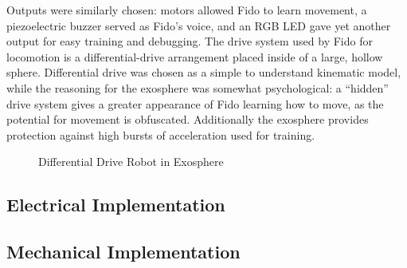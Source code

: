 Outputs were similarly chosen: motors allowed Fido to learn movement, a piezoelectric buzzer served as Fido's voice, and an RGB LED gave yet another output for easy training and debugging.  The drive system used by Fido for locomotion is a differential-drive arrangement placed inside of a large, hollow sphere.  Differential drive was chosen as a simple to understand kinematic model, while the reasoning for the exosphere was somewhat psychological: a ``hidden'' drive system gives a greater appearance of Fido learning how to move, as the potential for movement is obfuscated.  Additionally the exosphere provides protection against high bursts of acceleration used for training.

\begin{figure}
	\centering
	
	\caption{Differential Drive Robot in Exosphere}
\end{figure}

\subsection{Electrical Implementation}

\subsection{Mechanical Implementation}